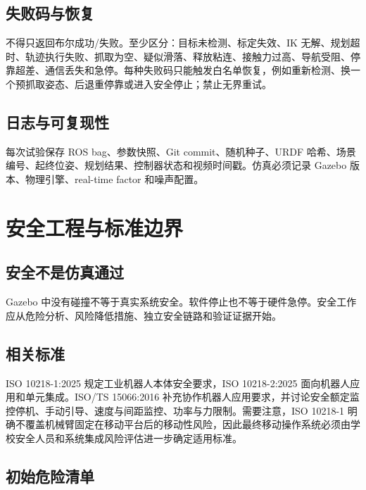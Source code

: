 \documentclass[UTF8,12pt,oneside]{ctexrep}
\begin{document}
\section{失败码与恢复}

不得只返回布尔成功/失败。至少区分：目标未检测、标定失效、IK 无解、规划超时、轨迹执行失败、抓取为空、疑似滑落、释放粘连、接触力过高、导航受阻、停靠超差、通信丢失和急停。每种失败码只能触发白名单恢复，例如重新检测、换一个预抓取姿态、后退重停靠或进入安全停止；禁止无界重试。

\section{日志与可复现性}

每次试验保存 ROS bag、参数快照、Git commit、随机种子、URDF 哈希、场景编号、起终位姿、规划结果、控制器状态和视频时间戳。仿真必须记录 Gazebo 版本、物理引擎、real-time factor 和噪声配置。

\chapter{安全工程与标准边界}

\section{安全不是仿真通过}

Gazebo 中没有碰撞不等于真实系统安全。软件停止也不等于硬件急停。安全工作应从危险分析、风险降低措施、独立安全链路和验证证据开始。

\section{相关标准}

ISO 10218-1:2025 规定工业机器人本体安全要求，ISO 10218-2:2025 面向机器人应用和单元集成\cite{iso10218_1_2025,iso10218_2_2025}。ISO/TS 15066:2016 补充协作机器人应用要求，并讨论安全额定监控停机、手动引导、速度与间距监控、功率与力限制\cite{iso15066_2016}。需要注意，ISO 10218-1 明确不覆盖机械臂固定在移动平台后的移动性风险，因此最终移动操作系统必须由学校安全人员和系统集成风险评估进一步确定适用标准。

\section{初始危险清单}
\end{document}
